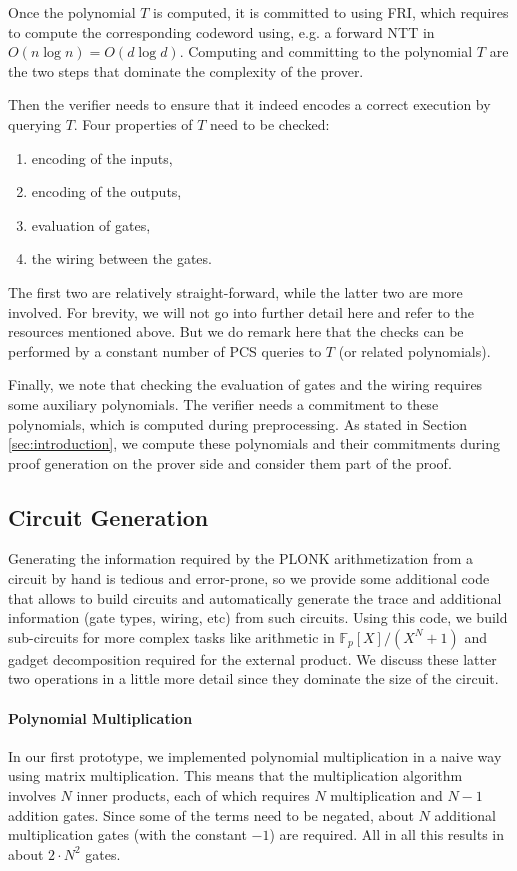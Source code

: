 \documentclass{zamarep}
\newcommand{\field}{\mathbb{F}}
\begin{document}
Once the polynomial $T$ is computed, it is committed to using FRI, which requires to compute the corresponding codeword using, e.g. a forward NTT in $O(n \log n) = O(d \log d)$. Computing and committing to the polynomial $T$ are the two steps that dominate the complexity of the prover.

Then the verifier needs to ensure that it indeed encodes a correct execution by querying $T$. Four properties of $T$ need to be checked:
\begin{enumerate}
\item encoding of the inputs,
\item encoding of the outputs,
\item evaluation of gates,
\item the wiring between the gates.
\end{enumerate}
The first two are relatively straight-forward, while the latter two are more involved. For brevity, we will not go into further detail here and refer to the resources mentioned above. But we do remark here that the checks can be performed by a constant number of PCS queries to $T$ (or related polynomials).

Finally, we note that checking the evaluation of gates and the wiring requires some auxiliary polynomials. The verifier needs a commitment to these polynomials, which is computed during preprocessing. As stated in Section \ref{sec:introduction}, we compute these polynomials and their commitments during proof generation on the prover side and consider them part of the proof.

\subsection{Circuit Generation}
\label{sec:circuit}
Generating the information required by the PLONK arithmetization from a circuit by hand is tedious and error-prone, so we provide some additional code that allows to build circuits and automatically generate the trace and additional information (gate types, wiring, etc) from such circuits. Using this code, we build sub-circuits for more complex tasks like arithmetic in $\field_p[X]/(X^N + 1)$ and gadget decomposition required for the external product. We discuss these latter two operations in a little more detail since they dominate the size of the circuit.

\paragraph{Polynomial Multiplication}
In our first prototype, we implemented polynomial multiplication in a naive way using matrix multiplication. This means that the multiplication algorithm involves $N$ inner products, each of which requires $N$ multiplication and $N - 1$ addition gates. Since some of the terms need to be negated, about $N$ additional multiplication gates (with the constant $-1$) are required. All in all this results in about $2 \cdot N^2$ gates.
\end{document}
